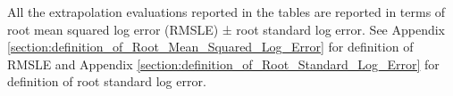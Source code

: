 \documentclass{article} %
\begin{document}
All the extrapolation evaluations reported in the tables are reported in terms of root mean squared log error (RMSLE) ± root standard log error. See Appendix \ref{section:definition_of_Root_Mean_Squared_Log_Error} for definition of RMSLE and Appendix \ref{section:definition_of_Root_Standard_Log_Error} for definition of root standard log error.

\vspace{-0.4mm}



\end{document}
